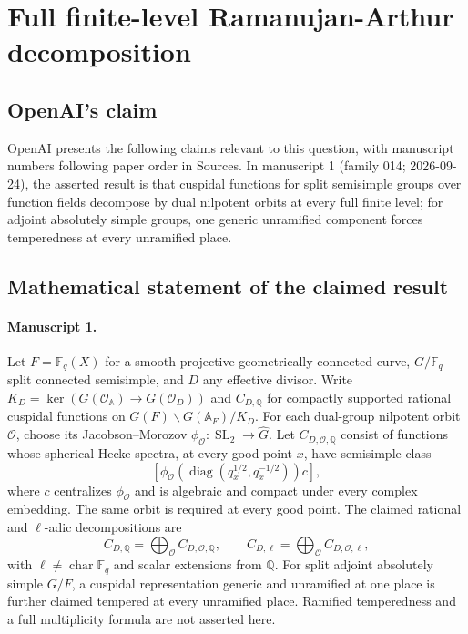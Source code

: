 \documentclass[11pt]{article}
\begin{document}
\section*{Full finite-level Ramanujan-Arthur decomposition}

\subsection{OpenAI's claim}
OpenAI presents the following claims relevant to this question, with manuscript numbers following paper order in Sources. In manuscript 1 (family 014; 2026-09-24), the asserted result is that cuspidal functions for split semisimple groups over function fields decompose by dual nilpotent orbits at every full finite level; for adjoint absolutely simple groups, one generic unramified component forces temperedness at every unramified place.

\subsection{Mathematical statement of the claimed result}
\paragraph{Manuscript 1.}
Let $F=\mathbb F_q(X)$ for a smooth projective geometrically connected curve, $G/\mathbb F_q$ split connected semisimple, and $D$ any effective divisor. Write $K_D=\ker(G(\mathcal O_{\mathbb A})\to G(\mathcal O_D))$ and $C_{D,\mathbb Q}$ for compactly supported rational cuspidal functions on $G(F)\backslash G(\mathbb A_F)/K_D$. For each dual-group nilpotent orbit $\mathcal O$, choose its Jacobson--Morozov $\phi_{\mathcal O}:\operatorname{SL}_2\to\widehat G$. Let $C_{D,\mathcal O,\mathbb Q}$ consist of functions whose spherical Hecke spectra, at every good point $x$, have semisimple class
\[
 [\phi_{\mathcal O}(\operatorname{diag}(q_x^{1/2},q_x^{-1/2}))c],
\]
where $c$ centralizes $\phi_{\mathcal O}$ and is algebraic and compact under every complex embedding. The same orbit is required at every good point. The claimed rational and $\ell$-adic decompositions are
\[
 C_{D,\mathbb Q}=\bigoplus_{\mathcal O} C_{D,\mathcal O,\mathbb Q},\qquad
 C_{D,\ell}=\bigoplus_{\mathcal O} C_{D,\mathcal O,\ell},
\]
with $\ell\ne\operatorname{char}\mathbb F_q$ and scalar extensions from $\mathbb Q$. For split adjoint absolutely simple $G/F$, a cuspidal representation generic and unramified at one place is further claimed tempered at every unramified place. Ramified temperedness and a full multiplicity formula are not asserted here.
\end{document}
